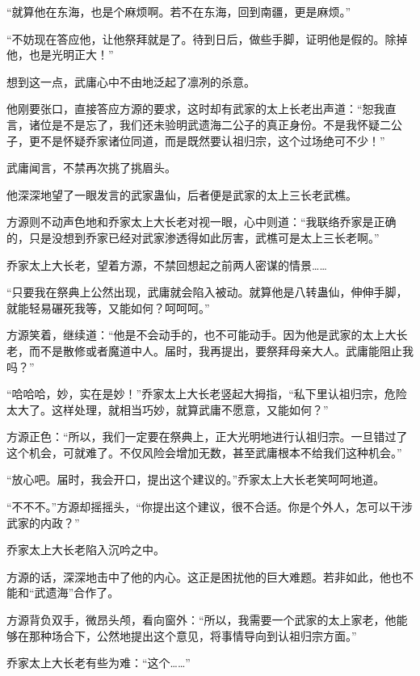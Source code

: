 \begin{this_body}
“就算他在东海，也是个麻烦啊。若不在东海，回到南疆，更是麻烦。”

“不妨现在答应他，让他祭拜就是了。待到日后，做些手脚，证明他是假的。除掉他，也是光明正大！”

想到这一点，武庸心中不由地泛起了凛冽的杀意。

他刚要张口，直接答应方源的要求，这时却有武家的太上长老出声道：“恕我直言，诸位是不是忘了，我们还未验明武遗海二公子的真正身份。不是我怀疑二公子，更不是怀疑乔家诸位同道，而是既然要认祖归宗，这个过场绝可不少！”

武庸闻言，不禁再次挑了挑眉头。

他深深地望了一眼发言的武家蛊仙，后者便是武家的太上三长老武樵。

方源则不动声色地和乔家太上大长老对视一眼，心中则道：“我联络乔家是正确的，只是没想到乔家已经对武家渗透得如此厉害，武樵可是太上三长老啊。”

乔家太上大长老，望着方源，不禁回想起之前两人密谋的情景……

“只要我在祭典上公然出现，武庸就会陷入被动。就算他是八转蛊仙，伸伸手脚，就能轻易碾死我等，又能如何？呵呵呵。”

方源笑着，继续道：“他是不会动手的，也不可能动手。因为他是武家的太上大长老，而不是散修或者魔道中人。届时，我再提出，要祭拜母亲大人。武庸能阻止我吗？”

“哈哈哈，妙，实在是妙！”乔家太上大长老竖起大拇指，“私下里认祖归宗，危险太大了。这样处理，就相当巧妙，就算武庸不愿意，又能如何？”

方源正色：“所以，我们一定要在祭典上，正大光明地进行认祖归宗。一旦错过了这个机会，可就难了。不仅风险会增加无数，甚至武庸根本不给我们这种机会。”

“放心吧。届时，我会开口，提出这个建议的。”乔家太上大长老笑呵呵地道。

“不不不。”方源却摇摇头，“你提出这个建议，很不合适。你是个外人，怎可以干涉武家的内政？”

乔家太上大长老陷入沉吟之中。

方源的话，深深地击中了他的内心。这正是困扰他的巨大难题。若非如此，他也不能和“武遗海”合作了。

方源背负双手，微昂头颅，看向窗外：“所以，我需要一个武家的太上家老，他能够在那种场合下，公然地提出这个意见，将事情导向到认祖归宗方面。”

乔家太上大长老有些为难：“这个……”

\end{this_body}

